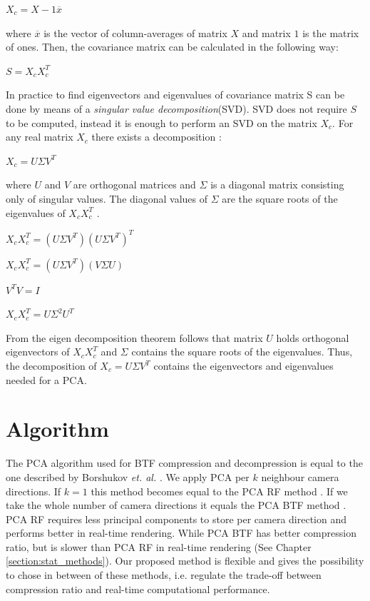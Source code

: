 {\centering$X_{c}=X-1\overline{x}$\\}

where $\overline{x}$ is the vector of column-averages of matrix $X$ and matrix $1$ is the matrix of ones.
Then, the covariance matrix can be calculated in the following way:

{\centering$S=X_{c}X_{c}^T$\\}


In practice to find eigenvectors and eigenvalues of covariance matrix S can be done by means of a \emph{singular value decomposition}(SVD).
SVD does not require $S$ to be computed, instead it is enough to perform an SVD on the matrix $X_{c}$.
For any real matrix $X_{c}$ there exists a decomposition \cite{svd}:

{\centering $X_{c}=U\Sigma V^{T}$ \\}

where $U$ and $V$ are orthogonal matrices and $\Sigma$ is a diagonal matrix consisting only of singular values.
The diagonal values of $\Sigma$ are the square roots of the eigenvalues of $X_{c}X_{c}^T$ \cite{Lecture12A}.


{\centering $X_{c}X_{c}^T=(U\Sigma V^{T})(U\Sigma V^{T})^T$ \\}

{\centering $X_{c}X_{c}^T=(U\Sigma V^{T})(V\Sigma U)$ \\}

{\centering $V^{T}V=I$ \\}

{\centering $X_{c}X_{c}^T=U\Sigma^2 U^{T}$ \\}

From the eigen decomposition theorem \cite{eigendecompostion} follows that matrix $U$ holds orthogonal eigenvectors of $X_{c}X_{c}^T$
and $\Sigma$ contains the square roots of the eigenvalues.
Thus, the decomposition of $X_{c}=U\Sigma V^{T}$ contains the eigenvectors and eigenvalues needed for a PCA.

\section{Algorithm}
\label{section:algorithm_step}
The PCA algorithm used for BTF compression and decompression is equal to the one described by Borshukov  \emph{et. al.} \cite[Ch.\ 15]{gpu_gems}.
We apply PCA per $k$ neighbour camera directions. 
 If $k=1$ this method becomes equal to the PCA RF method \cite{haindl}. 
If we take the whole number of camera directions it equals the PCA BTF method \cite{haindl}.
PCA RF requires less principal components to store per camera direction and performs better in real-time rendering. 
While PCA BTF has better compression ratio, but is slower than PCA RF in real-time rendering (See Chapter \ref{section:stat_methods}).
Our proposed method is flexible and gives the possibility to chose in between of these methods, i.e. regulate the trade-off between compression ratio and real-time computational performance.

